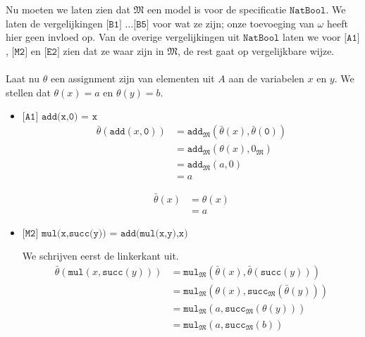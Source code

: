 \documentclass[a4paper,11pt]{article}
\begin{document}
Nu moeten we laten zien dat $\mathfrak{M}$ een model is voor de specificatie
$\texttt{NatBool}$. We laten de vergelijkingen $\texttt{[B1] \ldots [B5]}$
voor wat ze zijn; onze toevoeging van $\omega$ heeft hier geen invloed
op. Van de overige vergelijkingen uit $\texttt{NatBool}$ laten we voor
$\texttt{[A1]}$, $\texttt{[M2]}$ en $\texttt{[E2]}$ zien dat ze waar zijn in
$\mathfrak{M}$, de rest gaat op vergelijkbare wijze.

\paragraph{}

Laat nu $\theta$ een assignment zijn van elementen uit $A$ aan de variabelen
$x$ en $y$. We stellen dat $\theta(x) = a$ en $\theta(y) = b$.

\begin{itemize}

\item{$\texttt{[A1] add(x,0) = x}$}
\begin{align*}
\bar \theta(\texttt{add}(x,\texttt{0})) &= \texttt{add}_{\mathfrak{M}}(\bar \theta(x), \bar \theta(\texttt{0})) \\
                                        &= \texttt{add}_{\mathfrak{M}}(\theta(x), 0_{\mathfrak{M}}) \\
                                        &= \texttt{add}_{\mathfrak{M}}(a, 0) \\
                                        &= a
\end{align*}

\begin{align*}
\bar \theta(x) &= \theta(x) \\
               &= a
\end{align*}

\item{$\texttt{[M2] mul(x,succ(y)) = add(mul(x,y),x)}$}

We schrijven eerst de linkerkant uit.
\begin{align*}
\bar \theta(\texttt{mul}(x,\texttt{succ}(y))) &= \texttt{mul}_{\mathfrak{M}}(\bar \theta(x), \bar \theta(\texttt{succ}(y))) \\
                                              &= \texttt{mul}_{\mathfrak{M}}(\theta(x), \texttt{succ}_{\mathfrak{M}}(\bar \theta(y))) \\
                                              &= \texttt{mul}_{\mathfrak{M}}(a, \texttt{succ}_{\mathfrak{M}}(\theta(y))) \\
                                              &= \texttt{mul}_{\mathfrak{M}}(a, \texttt{succ}_{\mathfrak{M}}(b))
\end{align*}


\end{itemize}
\end{document}
